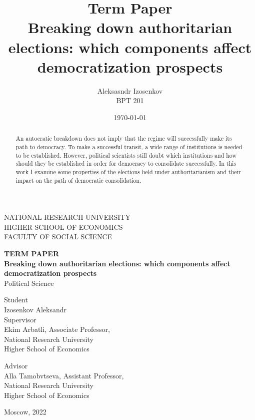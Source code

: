 \documentclass[a4paper, 12pt]{article}
\title{
Term Paper \\  Breaking down authoritarian elections: which components affect democratization prospects}
\author{Aleksasndr Izosenkov \\ BPT 201}
\date{\today}
\begin{document}
\doublespacing

\thispagestyle{empty} 

\begin{center}
NATIONAL RESEARCH UNIVERSITY
\\
HIGHER SCHOOL OF ECONOMICS
\\
FACULTY OF SOCIAL SCIENCE

\end{center}
\vspace{12ex}

\begin{center}
\textbf{TERM PAPER}\\
\vspace{2ex}
\textbf{Breaking down authoritarian elections: which components affect democratization prospects}\\
\vspace{2ex}
Political Science
\end{center}

\vspace{5ex}
\begin{flushright}
\hspace{40ex}
Student\\
Izosenkov Aleksandr \\

\vspace{5ex}
Supervisor\\
Ekim Arbatli, Associate Professor,\\ National Research University \\ Higher School of Economics

\vspace{5ex}
Advisor\\
Alla Tamobvtseva, Assistant Professor, \\National Research University\\ Higher School of Economics


\end{flushright}

\begin{center}
\vfill
Moscow, 2022
\end{center}

\newpage

\tableofcontents

\newpage

\begin{abstract}
An autocratic breakdown does not imply that the regime will successfully make its path to democracy. To make a successful transit, a wide range of institutions is needed to be established. However, political scientists still doubt which institutions and how should they be established in order for democracy to consolidate successfully. In this work I examine some properties of the elections held under authoritarianism and their impact on the path of democratic consolidation. \end{abstract}
\end{document}
